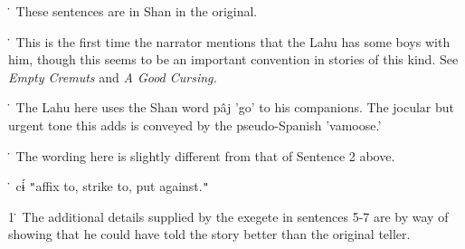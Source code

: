 \. These sentences are in Shan in the original.

\. This is the first time the narrator mentions that the Lahu has some boys with
him, though this seems to be an important convention in stories of this kind. See\textit{
Empty Cremuts} and \textit{A Good Cursing.}

\. The Lahu here uses the Shan word pâj 'go' to his companions. The jocular but
urgent tone this adds is conveyed by the pseudo-Spanish 'vamoose.'

\. The wording here is slightly different from that of Sentence 2 above.

\. cɨ́ \texttt{"}affix to, strike to, put against.\texttt{"}

1\. The additional details supplied by the exegete in sentences 5-7 are by way
of showing that he could have told the story better than the original teller.




